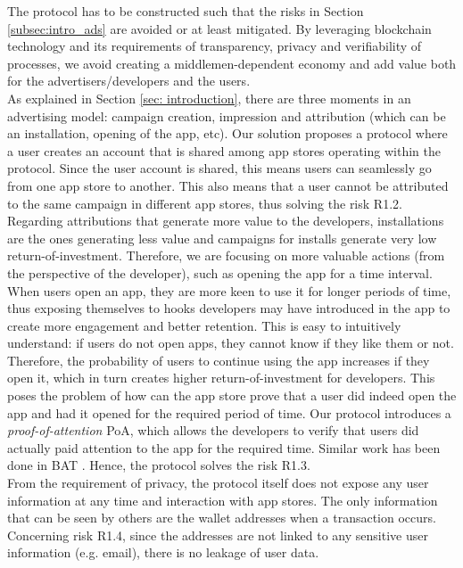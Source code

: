 The protocol has to be constructed such that the risks in Section \ref{subsec:intro_ads} are avoided or at least mitigated. By leveraging blockchain technology and its requirements of transparency, privacy and verifiability of processes, we avoid creating a middlemen-dependent economy and add value both for the advertisers/developers and the users. \\

As explained in Section \ref{sec: introduction}, there are three moments in an advertising model: campaign creation, impression and attribution (which can be an installation, opening of the app, etc). Our solution proposes a protocol where a user creates an account that is shared among app stores operating within the protocol. Since the user account is shared, this means users can seamlessly go from one app store to another. This also means that a user cannot be attributed to the same campaign in different app stores, thus solving the risk \textsf{R1.2}. \\

Regarding attributions that generate more value to the developers, installations are the ones generating less value and campaigns for installs generate very low return-of-investment. Therefore, we are focusing on more valuable actions (from the perspective of the developer), such as opening the app for a time interval. When users open an app, they are more keen to use it for longer periods of time, thus exposing themselves to hooks developers may have introduced in the app to create more engagement and better retention. This is easy to intuitively understand: if users do not open apps, they cannot know if they like them or not. Therefore, the probability of users to continue using the app increases if they open it, which in turn creates higher return-of-investment for developers. This poses the problem of how can the app store prove that a user did indeed open the app and had it opened for the required period of time. Our protocol introduces a \textit{proof-of-attention} \textsf{PoA}, which allows the developers to verify that users did actually paid attention to the app for the required time. Similar work has been done in BAT \cite{BAT}. Hence, the protocol solves the risk \textsf{R1.3}. \\

From the requirement of privacy, the protocol itself does not expose any user information at any time and interaction with app stores. The only information that can be seen by others are the wallet addresses when a transaction occurs. Concerning risk \textsf{R1.4}, since the addresses are not linked to any sensitive user information (e.g. email), there is no leakage of user data. \\

